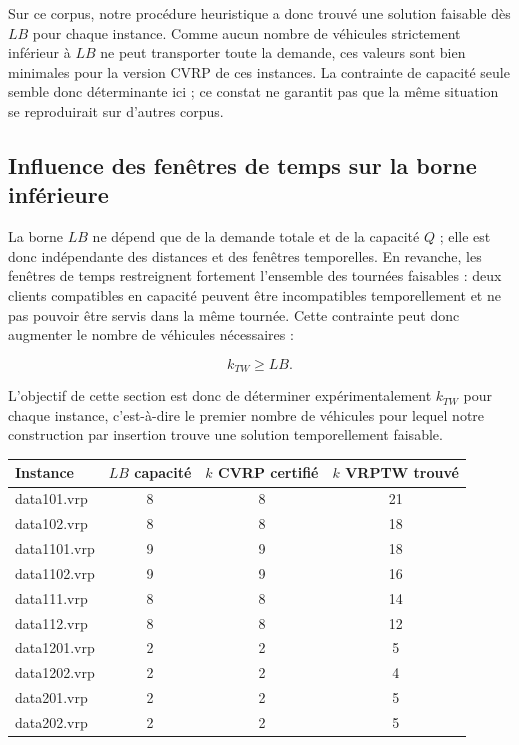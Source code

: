 \documentclass[11pt,a4paper]{article}
\begin{document}
Sur ce corpus, notre procédure heuristique a donc trouvé une solution faisable dès $LB$ pour chaque instance. Comme aucun nombre de véhicules strictement inférieur à \(LB\) ne peut transporter toute la demande, ces valeurs sont bien minimales pour la version CVRP de ces instances. La contrainte de capacité seule semble donc déterminante ici ; ce constat ne garantit pas que la même situation se reproduirait sur d'autres corpus.

\subsection{Influence des fenêtres de temps sur la borne inférieure}

La borne $LB$ ne dépend que de la demande totale et de la capacité $Q$ ; elle est donc indépendante des distances et des fenêtres temporelles. En revanche, les fenêtres de temps restreignent fortement l'ensemble des tournées faisables : deux clients compatibles en capacité peuvent être incompatibles temporellement et ne pas pouvoir être servis dans la même tournée. Cette contrainte peut donc augmenter le nombre de véhicules nécessaires :

\[
k_{TW} \ge LB.
\]

L'objectif de cette section est donc de déterminer expérimentalement $k_{TW}$ pour chaque instance, c'est-à-dire le premier nombre de véhicules pour lequel notre construction par insertion trouve une solution temporellement faisable.

\begin{center}
\begin{tabular}{lccc}
\toprule
Instance & \(LB\) capacité & \(k\) CVRP certifié & \(k\) VRPTW trouvé \\
\midrule
data101.vrp  & 8 & 8 & 21 \\
data102.vrp  & 8 & 8 & 18 \\
data1101.vrp & 9 & 9 & 18 \\
data1102.vrp & 9 & 9 & 16 \\
data111.vrp  & 8 & 8 & 14 \\
data112.vrp  & 8 & 8 & 12 \\
data1201.vrp & 2 & 2 & 5 \\
data1202.vrp & 2 & 2 & 4 \\
data201.vrp  & 2 & 2 & 5 \\
data202.vrp  & 2 & 2 & 5 \\
\bottomrule
\end{tabular}
\end{center}
\end{document}
